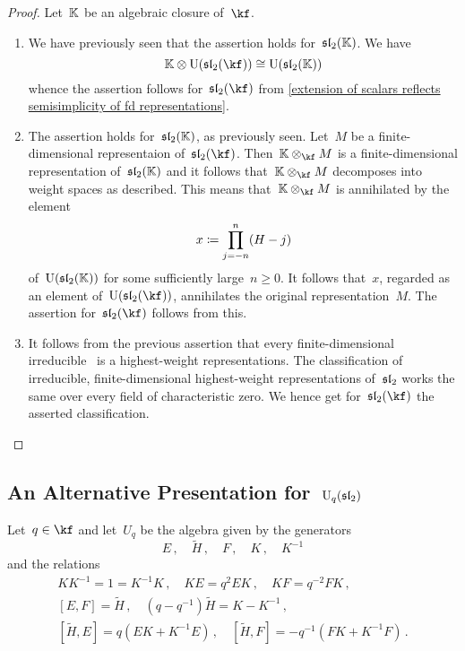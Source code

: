 \documentclass[a4paper, 11pt, oneside]{scrartcl}
\begin{document}
\begin{proof}
  Let~$\mathbb{K}$ be an algebraic closure of~$\kf$.
  \begin{enumerate}
    \item
      We have previously seen that the assertion holds for~$\mathfrak{sl}_2(\mathbb{K})$.
      We have
      \[
        \Kf \tensor \Univ(\sllie_2(\kf))
        \cong
        \Univ(\sllie_2(\Kf))
      \]
      whence the assertion follows for~$\sllie_2(\kf)$ from \cref{extension of scalars reflects semisimplicity of fd representations}.
    \item
      The assertion holds for~$\mathfrak{sl}_2(\mathbb{K})$, as previously seen.
      Let~$M$ be a finite-dimensional representaion of~$\sllie_2(\kf)$.
      Then~$\Kf \tensor_{\kf} M$ is a finite-dimensional representation of~$\mathfrak{sl}_2(\mathbb{K})$ and it follows that~$\Kf \tensor_{\kf} M$ decomposes into weight spaces as described.
      This means that~$\Kf \tensor_{\kf} M$ is annihilated by the element
      \[
        x \coloneqq \prod_{j=-n}^n (H - j)
      \]
      of~$\operatorname{U}(\mathfrak{sl}_2(\mathbb{K}))$ for some sufficiently large~$n \geq 0$.
      It follows that~$x$, regarded as an element of~$\Univ(\sllie_2(\kf))$, annihilates the original representation~$M$.
      The assertion for~$\sllie_2(\kf)$ follows from this.
    \item
      It follows from the previous assertion that every finite-dimensional irreducible~ is a highest-weight representations.
      The classification of irreducible, finite-dimensional highest-weight representations of~$\mathfrak{sl}_2$ works the same over every field of characteristic zero.
      We hence get for~$\sllie_2(\kf)$ the asserted classification.
    \qedhere
  \end{enumerate}
\end{proof}



\subsection{An Alternative Presentation for~$\operatorname{U}_q(\mathfrak{sl}_2)$}
\label{alternative presentation for quantum sl2}

Let~$q \in \kf$ and let~$U_q$ be the algebra given by the generators
\[
  E \,,
  \quad
  \widetilde{H} \,,
  \quad
  F \,,
  \quad
  K \,,
  \quad
  K^{-1} 
\]
and the relations
\begin{gather*}
  K K^{-1} = 1 = K^{-1} K \,,
  \quad
  KE = q^2 EK \,,
  \quad
  KF = q^{-2} FK \,,
  \\
  [E,F] = \widetilde{H} \,,
  \quad
  (q - q^{-1}) \widetilde{H} = K - K^{-1} \,,
  \\
  [\widetilde{H}, E] = q(EK + K^{-1} E) \,,
  \quad
  [\widetilde{H}, F] = -q^{-1}(FK + K^{-1} F) \,.
\end{gather*}
\end{document}
